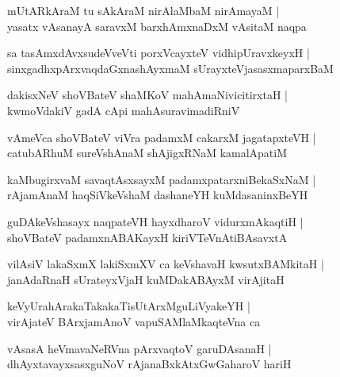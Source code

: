 \documentclass[twoside,12pt,openright]{book}
\newcounter{shloka}[chapter]
\begin{document}
\begin{shloka}%
mUtARkAraM tu sAkAraM nirAlaMbaM nirAmayaM |\\
yasatx vAsanayA saravxM barxhAmxnaDxM vAsitaM naqpa 
\end{shloka}

\begin{shloka}%
sa tasAmxdAvxsudeVveVti porxVcayxteV vidhipUravxkeyxH |\\
sinxgadhxpArxvaqdaGxnashAyxmaM sUrayxteVjasasxmaparxBaM 
\end{shloka}

\begin{shloka}%
dakisxNeV shoVBateV shaMKoV mahAmaNivicitirxtaH |\\
kwmoVdakiV gadA cApi mahAsuravimadiRniV 
\end{shloka}

\begin{shloka}%
vAmeVca shoVBateV viVra padamxM cakarxM jagatapxteVH |\\
catubARhuM sureVshAnaM shAjigxRNaM kamalApatiM 
\end{shloka}

\begin{shloka}%
kaMbugirxvaM savaqtAsxsayxM padamxpatarxniBekaSxNaM |\\
rAjamAnaM haqSiVkeVshaM dashaneYH kuMdasaninxBeYH
\end{shloka}

\begin{shloka}%
guDAkeVshasayx naqpateVH hayxdharoV vidurxmAkaqtiH |\\
shoVBateV padamxnABAKayxH kiriVTeVnAtiBAsavxtA 
\end{shloka}

\begin{shloka}%
vilAsiV lakaSxmX lakiSxmXV  ca keVshavaH kwsutxBAMkitaH |\\
janAdaRnaH sUrateyxVjaH kuMDakABAyxM virAjitaH
\end{shloka}

\begin{shloka}%
keVyUrahArakaTakakaTisUtArxMguLiVyakeYH |\\
virAjateV BArxjamAnoV vapuSAMlaMkaqteVna ca 
\end{shloka}

\begin{shloka}%
vAsasA heVmavaNeRVna pArxvaqtoV garuDAsanaH |\\
dhAyxtavayxsasxguNoV rAjanaBxkAtxGwGaharoV hariH 
\end{shloka}
\end{document}
